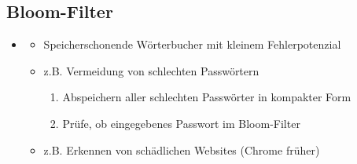 \documentclass[
    12pt,
    a4paper,
    ngerman,
    color=3b,%
    marginpar=false,
    colorback=false,
    leqno,
]{tudaexercise}
\begin{document}
\subsection{Bloom-Filter}\label{Bloom-Filter}
    \begin{itemize}
        \item {}
            \begin{itemize}
                \item Speicherschonende Wörterbucher mit kleinem Fehlerpotenzial
                \item z.B. Vermeidung von schlechten Passwörtern 
                    \begin{enumerate}
                        \item Abspeichern aller schlechten Passwörter in kompakter Form
                        \item Prüfe, ob eingegebenes Passwort im Bloom-Filter
                    \end{enumerate}
                \item z.B. Erkennen von schädlichen Websites (Chrome früher)
            \end{itemize}


\end{itemize}
\end{document}
